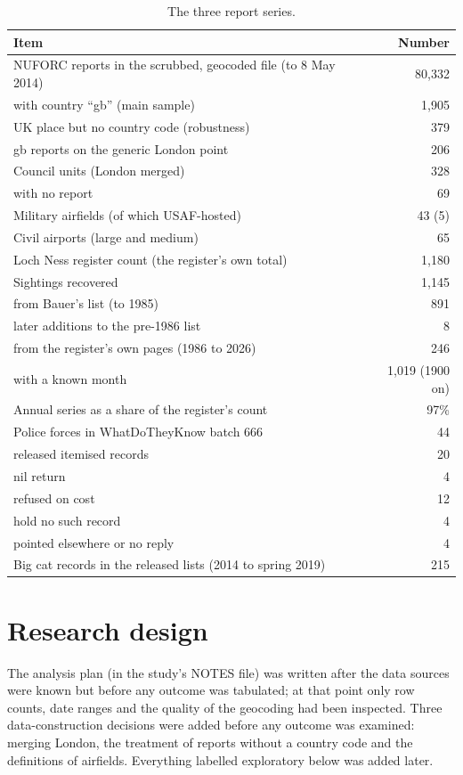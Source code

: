 \documentclass[11pt,a4paper]{article}
\begin{document}
\begin{table}[tbp]\centering\small\caption{The three report series.}\label{tab:sample}\begin{tabular}{lr}\toprule Item & Number\\\midrule
NUFORC reports in the scrubbed, geocoded file (to 8 May 2014) & 80,332\\
\quad with country ``gb'' (main sample) & 1,905\\
\quad UK place but no country code (robustness) & 379\\
\quad gb reports on the generic London point & 206\\
Council units (London merged) & 328\\
\quad with no report & 69\\
Military airfields (of which USAF-hosted) & 43 (5)\\
Civil airports (large and medium) & 65\\\midrule
Loch Ness register count (the register's own total) & 1,180\\
Sightings recovered & 1,145\\
\quad from Bauer's list (to 1985) & 891\\
\quad later additions to the pre-1986 list & 8\\
\quad from the register's own pages (1986 to 2026) & 246\\
\quad with a known month & 1,019 (1900 on)\\
Annual series as a share of the register's count & 97\%\\\midrule
Police forces in WhatDoTheyKnow batch 666 & 44\\
\quad released itemised records & 20\\
\quad nil return & 4\\
\quad refused on cost & 12\\
\quad hold no such record & 4\\
\quad pointed elsewhere or no reply & 4\\
Big cat records in the released lists (2014 to spring 2019) & 215\\
\bottomrule\end{tabular}\end{table}

\section{Research design}\label{sec:design}
The analysis plan (in the study's NOTES file) was written after the data sources were known but before any outcome was tabulated; at that point only row counts, date ranges and the quality of the geocoding had been inspected. Three data-construction decisions were added before any outcome was examined: merging London, the treatment of reports without a country code and the definitions of airfields. Everything labelled exploratory below was added later.
\end{document}
